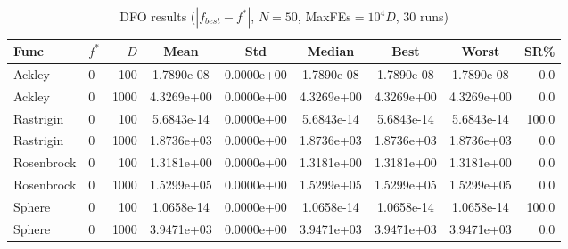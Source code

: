 
\begin{table}[htbp]\centering
\caption{DFO results ($|f_{best}-f^*|$, $N=50$, MaxFEs$=10^4D$, 30 runs)}
\label{tab:dfo}
\small
\begin{tabular}{llrcccccr}
\toprule
Func & $f^*$ & $D$ & Mean & Std & Median & Best & Worst & SR\%\\
\midrule
Ackley & 0 & 100 & 1.7890e-08 & 0.0000e+00 & 1.7890e-08 & 1.7890e-08 & 1.7890e-08 & 0.0 \\
Ackley & 0 & 1000 & 4.3269e+00 & 0.0000e+00 & 4.3269e+00 & 4.3269e+00 & 4.3269e+00 & 0.0 \\
\midrule
Rastrigin & 0 & 100 & 5.6843e-14 & 0.0000e+00 & 5.6843e-14 & 5.6843e-14 & 5.6843e-14 & 100.0 \\
Rastrigin & 0 & 1000 & 1.8736e+03 & 0.0000e+00 & 1.8736e+03 & 1.8736e+03 & 1.8736e+03 & 0.0 \\
\midrule
Rosenbrock & 0 & 100 & 1.3181e+00 & 0.0000e+00 & 1.3181e+00 & 1.3181e+00 & 1.3181e+00 & 0.0 \\
Rosenbrock & 0 & 1000 & 1.5299e+05 & 0.0000e+00 & 1.5299e+05 & 1.5299e+05 & 1.5299e+05 & 0.0 \\
\midrule
Sphere & 0 & 100 & 1.0658e-14 & 0.0000e+00 & 1.0658e-14 & 1.0658e-14 & 1.0658e-14 & 100.0 \\
Sphere & 0 & 1000 & 3.9471e+03 & 0.0000e+00 & 3.9471e+03 & 3.9471e+03 & 3.9471e+03 & 0.0 \\
\bottomrule
\end{tabular}
\end{table}
